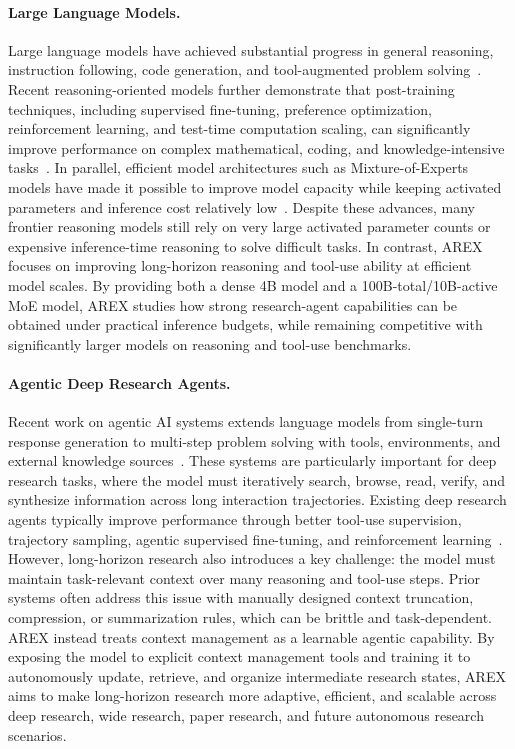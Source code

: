 \documentclass[]{selfevolagent}
\theoremstyle{plain}
\theoremstyle{definition}
\theoremstyle{remark}
\begin{document}
\paragraph{Large Language Models.}
Large language models have achieved substantial progress in general reasoning, instruction following, code generation, and tool-augmented problem solving~\cite{gpt4,claude,gemini,deepseekr1,qwen,llama}. Recent reasoning-oriented models further demonstrate that post-training techniques, including supervised fine-tuning, preference optimization, reinforcement learning, and test-time computation scaling, can significantly improve performance on complex mathematical, coding, and knowledge-intensive tasks~\cite{openai_o1,deepseekr1,kimi_k15}. In parallel, efficient model architectures such as Mixture-of-Experts models have made it possible to improve model capacity while keeping activated parameters and inference cost relatively low~\cite{switch_transformer,gshard,mixtral,deepseekv3}. Despite these advances, many frontier reasoning models still rely on very large activated parameter counts or expensive inference-time reasoning to solve difficult tasks. In contrast, \textsc{AREX} focuses on improving long-horizon reasoning and tool-use ability at efficient model scales. By providing both a dense 4B model and a 100B-total/10B-active MoE model, \textsc{AREX} studies how strong research-agent capabilities can be obtained under practical inference budgets, while remaining competitive with significantly larger models on reasoning and tool-use benchmarks.

\paragraph{Agentic Deep Research Agents.}
Recent work on agentic AI systems extends language models from single-turn response generation to multi-step problem solving with tools, environments, and external knowledge sources~\cite{react,toolformer,webgpt,deepresearch,searchr1,webdancer,websailor,tongyi_deepresearch,minddr}. These systems are particularly important for deep research tasks, where the model must iteratively search, browse, read, verify, and synthesize information across long interaction trajectories. Existing deep research agents typically improve performance through better tool-use supervision, trajectory sampling, agentic supervised fine-tuning, and reinforcement learning~\cite{webdancer,websailor,tongyi_deepresearch,minddr}. However, long-horizon research also introduces a key challenge: the model must maintain task-relevant context over many reasoning and tool-use steps. Prior systems often address this issue with manually designed context truncation, compression, or summarization rules, which can be brittle and task-dependent. \textsc{AREX} instead treats context management as a learnable agentic capability. By exposing the model to explicit context management tools and training it to autonomously update, retrieve, and organize intermediate research states, \textsc{AREX} aims to make long-horizon research more adaptive, efficient, and scalable across deep research, wide research, paper research, and future autonomous research scenarios.
\end{document}

